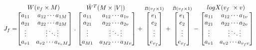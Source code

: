 \[J_{f} =\stackrel{\mbox{$W( v_{f}\times M)$ }}{%
    \begin{bmatrix}
    a_{11} & a_{12}  \cdots  a_{1M} \\
    a_{21} & a_{22}  \cdots  a_{2M} \\
    \vdots & \vdots  \ddots  \vdots \\
    a_{v1} & a_{v2}  \cdots  a_{v
_{e}M}
    \end{bmatrix}%
  } .
  \stackrel{\mbox{$\tilde{W}^T(M \times |V|)$ }}{%
    \begin{bmatrix}
    a_{11} & a_{12}  \cdots  a_{1v} \\
    a_{21} & a_{22} \cdots  a_{2v} \\
    \vdots & \vdots \ddots \vdots \\
    a_{M1} & a_{M2}  \cdots  a_{Mv}
    \end{bmatrix}%
  } +
  \stackrel{B( v_{f}\times 1)}{%
    \begin{bmatrix}
    e_1 \\
    e_2 \\
    \vdots \\
    e_{v_{f}}
    \end{bmatrix}%
   }
   +
  \stackrel{\tilde{B}(v_{f}\times 1)}{%
    \begin{bmatrix}
    e_1 \\
    e_2 \\
    \vdots \\
    e_{v_{f}}
    \end{bmatrix}%
   }-
   \stackrel{\mbox{$logX( v_{f}\ \times v)$ }}{%
    \begin{bmatrix}
    a_{11} & a_{12}  \cdots  a_{1v} \\
    a_{21} & a_{22}  \cdots  a_{2v} \\
    \vdots & \vdots  \ddots  \vdots \\
    a_{v1} & a_{v2}  \cdots  a_{v_{f}v}
    \end{bmatrix}%
  }
\]

